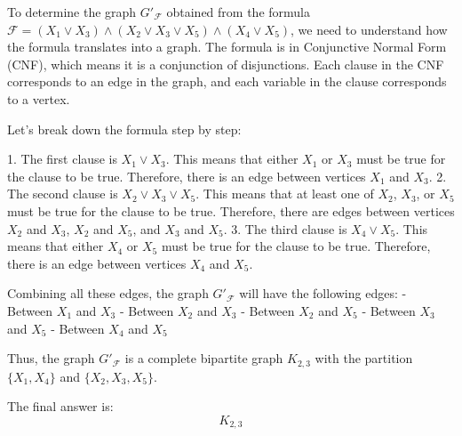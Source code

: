 To determine the graph \( G'_\mathcal{F} \) obtained from the formula \(\mathcal{F} = (X_1 \vee X_3) \wedge (X_2 \vee X_3 \vee X_5) \wedge (X_4 \vee X_5)\), we need to understand how the formula translates into a graph. The formula is in Conjunctive Normal Form (CNF), which means it is a conjunction of disjunctions. Each clause in the CNF corresponds to an edge in the graph, and each variable in the clause corresponds to a vertex.

Let's break down the formula step by step:

1. The first clause is \(X_1 \vee X_3\). This means that either \(X_1\) or \(X_3\) must be true for the clause to be true. Therefore, there is an edge between vertices \(X_1\) and \(X_3\).
2. The second clause is \(X_2 \vee X_3 \vee X_5\). This means that at least one of \(X_2\), \(X_3\), or \(X_5\) must be true for the clause to be true. Therefore, there are edges between vertices \(X_2\) and \(X_3\), \(X_2\) and \(X_5\), and \(X_3\) and \(X_5\).
3. The third clause is \(X_4 \vee X_5\). This means that either \(X_4\) or \(X_5\) must be true for the clause to be true. Therefore, there is an edge between vertices \(X_4\) and \(X_5\).

Combining all these edges, the graph \(G'_\mathcal{F}\) will have the following edges:
- Between \(X_1\) and \(X_3\)
- Between \(X_2\) and \(X_3\)
- Between \(X_2\) and \(X_5\)
- Between \(X_3\) and \(X_5\)
- Between \(X_4\) and \(X_5\)

Thus, the graph \(G'_\mathcal{F}\) is a complete bipartite graph \(K_{2,3}\) with the partition \(\{X_1, X_4\}\) and \(\{X_2, X_3, X_5\}\).

The final answer is:
\[
\boxed{K_{2,3}}
\]